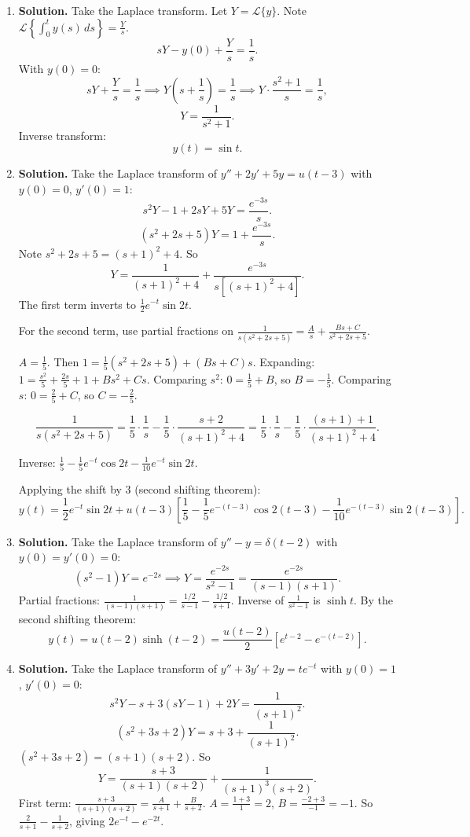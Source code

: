 \begin{enumerate}
\item \textbf{Solution.}
Take the Laplace transform. Let $Y=\mathcal{L}\{y\}$. Note $\mathcal{L}\!\left\{\int_0^t y(s)\,ds\right\}=\frac{Y}{s}$.
\[
sY - y(0) + \frac{Y}{s} = \frac{1}{s}.
\]
With $y(0)=0$:
\[
sY+\frac{Y}{s}=\frac{1}{s} \implies Y\!\left(s+\frac{1}{s}\right)=\frac{1}{s} \implies Y\cdot\frac{s^2+1}{s}=\frac{1}{s},
\]
\[
Y = \frac{1}{s^2+1}.
\]
Inverse transform:
\[
\boxed{y(t) = \sin t}.
\]

\item \textbf{Solution.}
Take the Laplace transform of $y''+2y'+5y=u(t-3)$ with $y(0)=0$, $y'(0)=1$:
\[
s^2Y-1+2sY+5Y = \frac{e^{-3s}}{s}.
\]
\[
(s^2+2s+5)Y = 1+\frac{e^{-3s}}{s}.
\]
Note $s^2+2s+5=(s+1)^2+4$. So
\[
Y = \frac{1}{(s+1)^2+4}+\frac{e^{-3s}}{s[(s+1)^2+4]}.
\]
The first term inverts to $\frac{1}{2}e^{-t}\sin 2t$.

For the second term, use partial fractions on $\frac{1}{s(s^2+2s+5)}=\frac{A}{s}+\frac{Bs+C}{s^2+2s+5}$.

$A=\frac{1}{5}$. Then $1=\frac{1}{5}(s^2+2s+5)+(Bs+C)s$. Expanding: $1=\frac{s^2}{5}+\frac{2s}{5}+1+Bs^2+Cs$. Comparing $s^2$: $0=\frac{1}{5}+B$, so $B=-\frac{1}{5}$. Comparing $s$: $0=\frac{2}{5}+C$, so $C=-\frac{2}{5}$.

\[
\frac{1}{s(s^2+2s+5)}=\frac{1}{5}\cdot\frac{1}{s}-\frac{1}{5}\cdot\frac{s+2}{(s+1)^2+4}=\frac{1}{5}\cdot\frac{1}{s}-\frac{1}{5}\cdot\frac{(s+1)+1}{(s+1)^2+4}.
\]

Inverse: $\frac{1}{5}-\frac{1}{5}e^{-t}\cos 2t - \frac{1}{10}e^{-t}\sin 2t$.

Applying the shift by 3 (second shifting theorem):
\[
\boxed{y(t) = \frac{1}{2}e^{-t}\sin 2t + u(t-3)\left[\frac{1}{5}-\frac{1}{5}e^{-(t-3)}\cos 2(t-3)-\frac{1}{10}e^{-(t-3)}\sin 2(t-3)\right]}.
\]

\item \textbf{Solution.}
Take the Laplace transform of $y''-y=\delta(t-2)$ with $y(0)=y'(0)=0$:
\[
(s^2-1)Y = e^{-2s} \implies Y = \frac{e^{-2s}}{s^2-1}=\frac{e^{-2s}}{(s-1)(s+1)}.
\]
Partial fractions: $\frac{1}{(s-1)(s+1)}=\frac{1/2}{s-1}-\frac{1/2}{s+1}$. Inverse of $\frac{1}{s^2-1}$ is $\sinh t$. By the second shifting theorem:
\[
\boxed{y(t) = u(t-2)\sinh(t-2) = \frac{u(t-2)}{2}\left[e^{t-2}-e^{-(t-2)}\right]}.
\]

\item \textbf{Solution.}
Take the Laplace transform of $y''+3y'+2y=te^{-t}$ with $y(0)=1$, $y'(0)=0$:
\[
s^2Y-s+3(sY-1)+2Y = \frac{1}{(s+1)^2}.
\]
\[
(s^2+3s+2)Y = s+3+\frac{1}{(s+1)^2}.
\]
$(s^2+3s+2)=(s+1)(s+2)$. So
\[
Y = \frac{s+3}{(s+1)(s+2)}+\frac{1}{(s+1)^3(s+2)}.
\]
First term: $\frac{s+3}{(s+1)(s+2)}=\frac{A}{s+1}+\frac{B}{s+2}$. $A=\frac{1+3}{1}=2$, $B=\frac{-2+3}{-1}=-1$. So $\frac{2}{s+1}-\frac{1}{s+2}$, giving $2e^{-t}-e^{-2t}$.


\end{enumerate}

